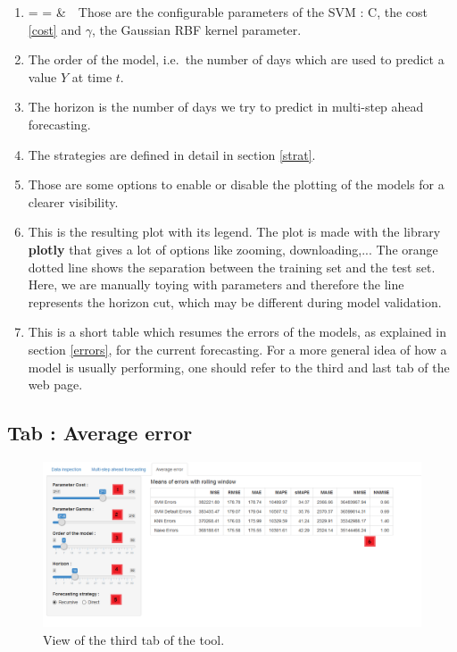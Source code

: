 \documentclass[11pt,a4paper,oneside]{book}
\makeatletter
\newcommand{\inlineitem}[1][]{%
\ifnum\enit@type=\tw@
    {\descriptionlabel{#1}}
  \hspace{\labelsep}
\else
  \ifnum\enit@type=\z@
       \refstepcounter{\@listctr}\fi
    \&\ \@itemlabel\ 
\fi}
\makeatother
\begin{document}
\begin{enumerate}
\item\inlineitem Those are the configurable parameters of the SVM : C, the cost \ref{cost} and $\gamma$, the Gaussian RBF kernel parameter.
\item The order of the model, i.e.\ the number of days which are used to predict a value $Y$ at time $t$.
\item The horizon is the number of days we try to predict in multi-step ahead forecasting.
\item The strategies are defined in detail in section \ref{strat}.
\item Those are some options to enable or disable the plotting of the models for a clearer visibility.
\item This is the resulting plot with its legend. The plot is made with the library \textbf{plotly} that gives a lot of options like zooming, downloading,... The orange dotted line shows the separation between the training set and the test set. Here, we are manually toying with parameters and therefore the line represents the horizon cut, which may be different during model validation.
\item This is a short table which resumes the errors of the models, as explained in section \ref{errors}, for the current forecasting. For a more general idea of how a model is usually performing, one should refer to the third and last tab of the web page. 
\end{enumerate}



\subsection{Tab : Average error}

\begin{figure}[!h]
  \centering
    \includegraphics[scale=0.44]{img/tab3.png}
  \caption{View of the third tab of the tool.}
  \label{fig:tool3}
\end{figure}
\end{document}

